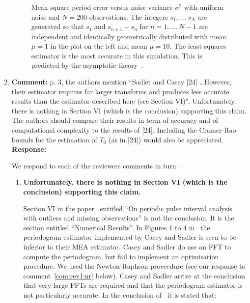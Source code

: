 \documentclass[a4paper,10pt]{article}
\begin{document}
\begin{enumerate}
\begin{figure}[p]
  \caption{Mean square period error versus noise variance $\sigma^2$ with uniform noise and $N=200$ observations.  The integers $s_1,\dots,s_N$ are generated so that $s_1$ and $s_{n+1} - s_n$ for $n=1,\dots,N-1$ are independent and identically geometrically distributed with mean $\mu = 1$ in the plot on the left and mean $\mu=10$.  The least squares estimator is the most accurate in this simulation. This is predicted by the asymptotic theory~\cite{Quinn_sparse_noisy_SSP_2012,Quinn20013asilomar_period_est}.}\label{plot:geomuniform}
\end{figure}


\item\textbf{Comment:}
p. 3, the authors mention “Sadler and Casey [24] \dots However, their estimator
requires far larger transforms and produces less accurate results than the estimator
described here (see Section VI)". Unfortunately, there is nothing in
Section VI (which is the conclusion) supporting this claim. The authors should
compare their results in term of accuracy and of computational complexity to
the results of [24]. Including the Cramer-Rao bounds for the estimation of $T_0$
(as in [24]) would also be appreciated.
\\
\textbf{Response:}

We respond to each of the reviewers comments in turn.

\begin{enumerate}

\item \textbf{Unfortunately, there is nothing in
Section VI (which is the conclusion) supporting this claim.}

Section VI in the paper~\cite{726812} entitled ``On periodic pulse interval analysis with outliers and missing observations'' is not the conclusion.  It is the section entitled ``Numerical Results''.  In Figures 1 to 4 in~\cite{726812} the periodogram estimator implemented by Casey and Sadler is seen to be inferior to their MEA estimator.  Casey and Sadler do use an FFT to compute the periodogram, but fail to implement an optimisation procedure. We used the Newton-Raphson proceedure (see our response to comment~\ref{com:rev1:nr} below).  Casey and Sadler arrive at the conclusion that very large FFTs are required and that the periodogram estimator is not particularly accurate.  In the conclusion of~\cite{726812} it is stated that:


\end{enumerate}
\end{enumerate}
\end{document}
